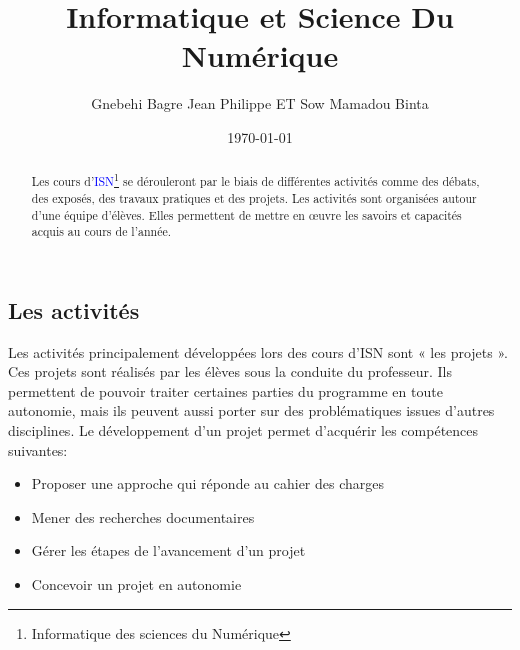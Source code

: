 \documentclass[a4paper, 12pt]{article}
\title{Informatique et Science Du Numérique}
\date{\today}
\author{Gnebehi Bagre Jean Philippe ET Sow Mamadou Binta}
\begin{document}
	\maketitle
	
\newpage
	\tableofcontents
	
\newpage

\begin{minipage}{.9\textwidth}%
	\listoffigures {} 
	\vspace{5cm}
	\listoftables {} 
\end{minipage}

\newpage

	\begin{abstract}

Les cours \cite{ISN1} d'\textcolor{blue}{ISN}\footnote{Informatique des sciences du Numérique}  se dérouleront par le biais de différentes activités comme des débats, des exposés, des travaux pratiques et des projets. Les activités sont organisées autour d'une équipe d'élèves. Elles permettent de mettre en œuvre les savoirs et capacités acquis au cours de l'année.
	\end{abstract}

	\newpage
\begin{center}
	\section{Les activités}
\end{center}
      
   Les activités principalement développées lors des cours d'ISN sont « les projets ». Ces projets sont réalisés par les élèves sous la conduite du professeur. Ils permettent de pouvoir traiter certaines parties du programme en toute autonomie, mais ils peuvent aussi porter sur des problématiques issues d'autres disciplines.
Le développement d'un projet permet d'acquérir les compétences suivantes:

      \begin{itemize}

\item Proposer une approche qui réponde au cahier des charges
\item Mener des recherches documentaires
\item Gérer les étapes de l'avancement d'un projet
\item Concevoir un projet en autonomie

      \end{itemize}
\end{document}
